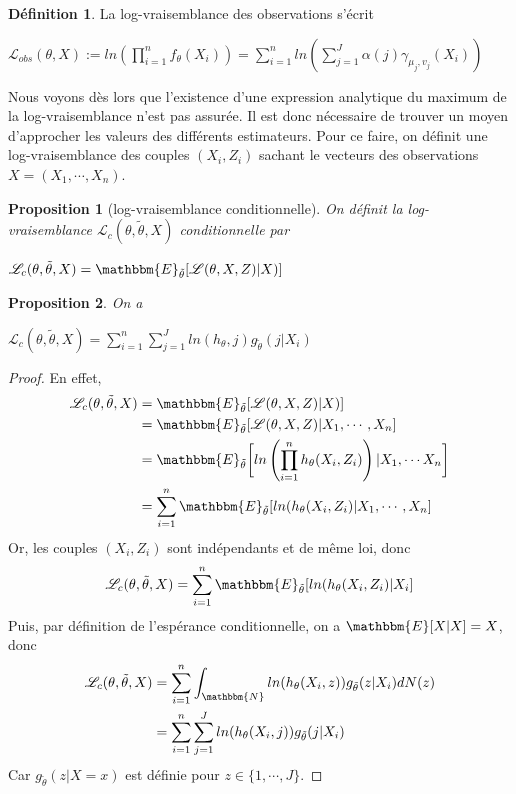 \documentclass[frenchb]{report}
\newcommand{\N}{\mathbbm{N}}
\newcommand{\1}{\mathbbm{1}}
\newcommand{\E}{\mathbbm{E}}
\newcommand{\lv}{\mathcal{L}}
\newcommand{\thetat}{\tilde{\theta}}
\newtheorem{prop}{Proposition}
\theoremstyle{definition}\newtheorem{defn}{Définition}
\theoremstyle{definition}\newtheorem{exm}{Exemple}
\theoremstyle{definition}\newtheorem{nota}{Notation}
\theoremstyle{definition}\newtheorem{rem}{Remarque}
\begin{document}
\begin{defn} 
La log-vraisemblance des observations s'écrit 
\begin{center} $\mathcal{L}_{obs}(\theta,X) := ln\left( \displaystyle\prod_{i=1}^n f_\theta(X_i) \right) = \displaystyle\sum_{i=1}^nln\left( \sum_{j=1}^J \alpha(j) \gamma_{\mu_j, v_j}(X_i) \right)$ \end{center}
\end{defn}

Nous voyons dès lors que l'existence d'une expression analytique du maximum de la log-vraisemblance n'est pas assurée. Il est donc nécessaire de trouver un moyen d'approcher les valeurs des différents estimateurs. \newline
Pour ce faire, on définit une log-vraisemblance des couples $(X_i,Z_i)$ sachant le vecteurs des observations $X = (X_1,\cdots,X_n)$.
\begin{prop}[log-vraisemblance conditionnelle]
On définit la log-vraisemblance $\lv_{c}(\theta, \thetat, X) $ conditionnelle par
\begin{center} $\lv_{c}(\theta, \thetat, X) = \E_{\thetat}[\lv(\theta,X,Z)|X)]$ \end{center}
\end{prop}

\begin{prop}
On a
\begin{center} $\lv_{c}(\theta, \thetat, X) = \displaystyle\sum_{i=1}^n\sum_{j=1}^J ln(h_\theta ,j)  g_{\thetat}(j|X_i)$ \end{center}
\end{prop}

\begin{proof}
En effet,
\begin{align*}
\lv_{c}(\theta, \thetat, X) &= \E_{\thetat}[\lv(\theta,X,Z)|X)] \\
&= \E_{\thetat}[\lv(\theta,X,Z)|X_1, \cdots, X_n]\\
&=  \E_{\thetat}\bigg[\displaystyle ln\left(\prod_{i=1}^n  h_\theta(X_i,Z_i)\right) |X_1,\cdots X_n \bigg]\\
&= \displaystyle\sum_{i=1}^n  \E_{\thetat}[ln(h_\theta(X_i,Z_i)|X_1,\cdots,X_n]\\
\end{align*}
Or, les couples $(X_i,Z_i)$ sont indépendants et de même loi, donc
\begin{align*}
\lv_{c}(\theta, \thetat, X) &= \displaystyle\sum_{i=1}^n  \E_{\thetat}[ln(h_\theta(X_i,Z_i)|X_i]\\
\end{align*}
Puis, par définition de l'espérance conditionnelle, on a $\E[X|X] = X$, donc
\begin{align*}
\lv_{c}(\theta, \thetat, X) &= \displaystyle\sum_{i=1}^n \int_{\N} ln(h_\theta(X_i,z)) g_{\thetat} (z|X_i) dN(z)\\
&= \displaystyle\sum_{i=1}^n\sum_{j=1}^J ln(h_\theta(X_i ,j))  g_{\thetat}(j|X_i)
\end{align*}
Car $g_{\thetat}(z | X = x)$ est définie pour $z\in \{1,\cdots,J\}$.
\end{proof}
\end{document}
